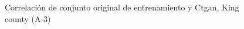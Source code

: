 \begin{figure}[H]
    \centering
    
    \caption{Correlación de conjunto original de entrenamiento y Ctgan, King county (A-3)}
    \label{pairwise-king county-a-3-ctgan}
\end{figure}